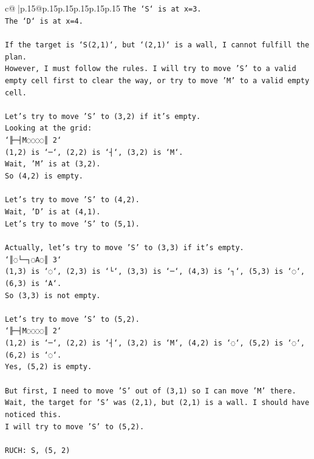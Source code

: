 \documentclass{article}
\begin{document}
{\begin{supertabular}{c@{$\;$}|p{.15\linewidth}@{}p{.15\linewidth}p{.15\linewidth}p{.15\linewidth}p{.15\linewidth}p{.15\linewidth}}
{{{\texttt{The `S` is at x=3.} \\
\texttt{The `D` is at x=4.} \\
\\ 
\texttt{If the target is `S(2,1)`, but `(2,1)` is a wall, I cannot fulfill the plan.} \\
\texttt{However, I must follow the rules. I will try to move 'S' to a valid empty cell first to clear the way, or try to move 'M' to a valid empty cell.} \\
\\ 
\texttt{Let's try to move 'S' to (3,2) if it's empty.} \\
\texttt{Looking at the grid:} \\
\texttt{`╟─┤M◌◌◌◌║ 2`} \\
\texttt{(1,2) is `─`, (2,2) is `┤`, (3,2) is `M`.} \\
\texttt{Wait, 'M' is at (3,2).} \\
\texttt{So (4,2) is empty.} \\
\\ 
\texttt{Let's try to move 'S' to (4,2).} \\
\texttt{Wait, 'D' is at (4,1).} \\
\texttt{Let's try to move 'S' to (5,1).} \\
\\ 
\texttt{Actually, let's try to move 'S' to (3,3) if it's empty.} \\
\texttt{`║◌└─┐◌A◌║ 3`} \\
\texttt{(1,3) is `◌`, (2,3) is `└`, (3,3) is `─`, (4,3) is `┐`, (5,3) is `◌`, (6,3) is `A`.} \\
\texttt{So (3,3) is not empty.} \\
\\ 
\texttt{Let's try to move 'S' to (5,2).} \\
\texttt{`╟─┤M◌◌◌◌║ 2`} \\
\texttt{(1,2) is `─`, (2,2) is `┤`, (3,2) is `M`, (4,2) is `◌`, (5,2) is `◌`, (6,2) is `◌`.} \\
\texttt{Yes, (5,2) is empty.} \\
\\ 
\texttt{But first, I need to move 'S' out of (3,1) so I can move 'M' there.} \\
\texttt{Wait, the target for 'S' was (2,1), but (2,1) is a wall. I should have noticed this.} \\
\texttt{I will try to move 'S' to (5,2).} \\
\\ 
\texttt{RUCH: S, (5, 2)} \\
            }
        }
    }
     \\ \\


\end{supertabular}}
\end{document}
